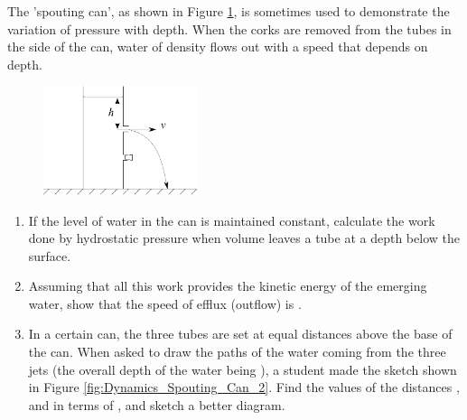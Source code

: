 
\begin{problem} 
{The 'spouting can', as shown in Figure \ref{fig:Dynamics_Spouting_Can}, is sometimes used to demonstrate the variation of pressure with depth. When the corks are removed from the tubes in the side of the can, water of density \vari{\rho} flows out with a speed that depends on depth.

\begin{figure}[h]
	\centering
	\includegraphics[width=0.4\textwidth]{../../../figures/Dynamics_Spouting_Can.svg}
	\caption{}\label{fig:Dynamics_Spouting_Can}
\end{figure}

\begin{enumerate} 
\item If the level of water in the can is maintained constant, calculate the work done by hydrostatic pressure when volume  leaves a tube at a depth  below the surface. 

\item Assuming that all this work provides the kinetic energy of the emerging water, show that the speed  of efflux (outflow) is .

\item In a certain can, the three tubes are set at equal distances  above the base of the can. When asked to draw the paths of the water coming from the three jets (the overall depth of the water being ), a student made the sketch shown  in Figure \ref{fig:Dynamics_Spouting_Can_2}. Find the values of the distances ,  and  in terms of , and sketch a better diagram. \end{enumerate}

}
\end{problem}
